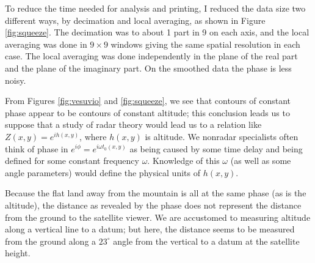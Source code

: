 \par
To reduce the time needed for analysis and printing,
I reduced the data size two different ways,
by decimation and local averaging,
as shown in Figure \ref{fig:squeeze}.
The decimation was to about 1 part in 9 on each axis,
and the local averaging was done in $9\times 9$ windows
giving the same spatial resolution in each case.
The local averaging was done independently in the
plane of the real part and the plane of the imaginary part.
On the smoothed data the phase is less noisy.

\par
From Figures \ref{fig:vesuvio} and \ref{fig:squeeze},
we see that contours of constant phase
appear to be contours of constant altitude;
this conclusion leads us to suppose that a study of radar theory
would lead us to a relation like $Z(x,y)=e^{ih(x,y)}$,
where $h(x,y)$ is altitude.
We nonradar specialists often think of phase in
$e^{i\phi} = e^{i\omega t_0(x,y)}$
as being caused by some time delay and
being defined for some constant frequency $\omega$.
Knowledge of this $\omega$ (as well as some angle parameters)
would define the physical units of $h(x,y)$.

Because the flat land away from the mountain is all at the same phase
(as is the altitude),
the distance as revealed by the phase does not represent
the distance from the ground to the satellite viewer.
We are accustomed to measuring altitude along a vertical line to a datum;
but here, the distance seems to be measured
from the ground along a $23^\circ$ angle from the vertical
to a datum at the satellite height.

